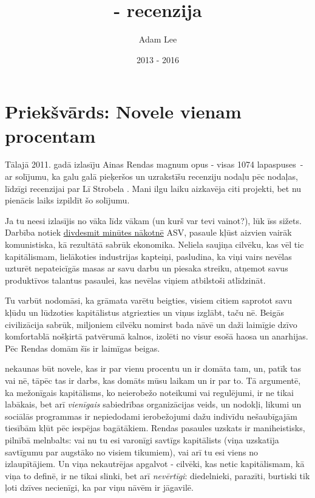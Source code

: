 \documentclass[12pt]{article}
\title{\say{Atlas Shrugged} - recenzija}
\author{Adam Lee}
\date{2013 - 2016}
\begin{document}
\maketitle

\tableofcontents

\section{Priekšvārds: Novele vienam procentam}
\label{sec:foreword}

Tālajā 2011. gadā izlasīju Ainas Rendas magnum opus  - visas 1074 lapaspuses~- ar solījumu, ka galu galā pieķeršos un uzrakstīšu recenziju nodaļu pēc nodaļas, līdzīgi recenzijai par Lī Strobela \href{https://web.archive.org/web/20160313005416/http://www.patheos.com/blogs/daylightatheism/series/the-case-for-a-creator}{}. Mani ilgu laiku aizkavēja citi projekti, bet nu pienācis laiks izpildīt šo solījumu.

Ja tu neesi izlasījis  no vāka līdz vākam (un kurš var tevi vainot?), lūk īss sižets. Darbība notiek \href{https://tvtropes.org/pmwiki/pmwiki.php/Main/TwentyMinutesIntoTheFuture}{divdesmit minūtes nākotnē} ASV, pasaule kļūst aizvien vairāk komunistiska, kā rezultātā sabrūk ekonomika. Neliela saujiņa cilvēku, kas vēl tic kapitālismam, lielākoties industrijas kapteiņi, pasludina, ka viņi vairs nevēlas uzturēt nepateicīgās masas ar savu darbu un piesaka streiku, atņemot savus produktīvos talantus pasaulei, kas nevēlas viņiem atbilstoši atlīdzināt.

Tu varbūt nodomāsi, ka grāmata varētu beigties, visiem citiem saprotot savu kļūdu un lūdzoties kapitālistus atgriezties un viņus izglābt, taču nē. Beigās civilizācija sabrūk, miljoniem cilvēku nomirst bada nāvē un daži laimīgie dzīvo komfortablā nošķirtā patvērumā kalnos, izolēti no visur esošā haosa un anarhijas. Pēc Rendas domām šīs ir laimīgas beigas.

 nekaunas būt novele, kas ir par vienu procentu un ir domāta tam, un, patīk tas vai nē, tāpēc tas ir darbs, kas domāts mūsu laikam un ir par to. Tā argumentē, ka mežonīgais kapitālisms, ko neierobežo noteikumi vai regulējumi, ir ne tikai labākais, bet arī \textit{vienīgais} sabiedrības organizācijas veids, un nodokļi, likumi un sociālās programmas ir nepiedodami ierobežojumi dažu indivīdu nešaubīgajām tiesībām kļūt pēc iespējas bagātākiem. Rendas pasaules uzskats ir maniheistisks, pilnībā melnbalts: vai nu tu esi varonīgi savtīgs kapitālists (viņa uzskatīja savtīgumu par augstāko no visiem tikumiem), vai arī tu esi viens no izlaupītājiem. Un viņa nekautrējas apgalvot - cilvēki, kas netic kapitālismam, kā viņa to definē, ir ne tikai slinki, bet arī \textit{nevērtīgi}: diedelnieki, parazīti, burtiski tik ļoti dzīves necienīgi, ka par viņu nāvēm ir jāgavilē.
\end{document}
